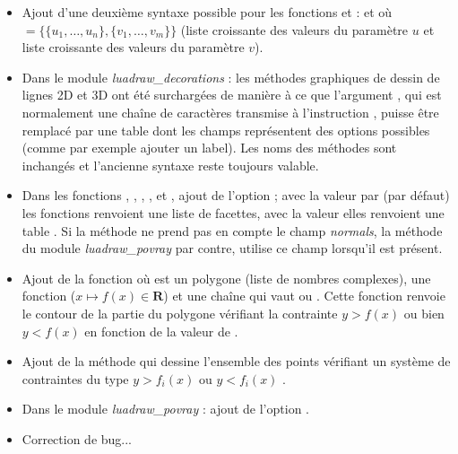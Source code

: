 \begin{itemize}
    \item Ajout d'une deuxième syntaxe possible pour les fonctions  et  :  et  où $=\{\{u_1,\ldots,u_n\}, \{v_1,\ldots,v_m\}\}$ (liste croissante des valeurs du paramètre $u$ et liste croissante des valeurs du paramètre $v$).

    \item Dans le module \emph{luadraw\_decorations} : les méthodes graphiques de dessin de lignes 2D et 3D ont été surchargées de manière à ce que l'argument , qui est normalement une chaîne de caractères transmise à l'instruction \drawcmd, puisse être remplacé par une table dont les champs représentent des options possibles (comme par exemple ajouter un label). Les noms des méthodes sont inchangés et l'ancienne syntaxe reste toujours valable.
    
    \item Dans les fonctions , , , ,  et , ajout de l'option ; avec la valeur par \false (par défaut) les fonctions renvoient une liste de facettes, avec la valeur \true elles renvoient une table . Si la méthode  ne prend pas en compte le champ \emph{normals}, la méthode  du module \emph{luadraw\_povray} par contre, utilise ce champ lorsqu'il est présent.
    
    \item Ajout de la fonction  où  est un polygone (liste de nombres complexes),  une fonction ($x\mapsto f(x)\in \mathbf R$) et  une chaîne qui vaut  ou . Cette fonction renvoie le contour de la partie du polygone vérifiant la contrainte $y>f(x)$ ou bien $y<f(x)$ en fonction de la valeur de .
    
    \item Ajout de la méthode  qui dessine l'ensemble des points vérifiant un système de contraintes du type $y>f_i(x)$ ou $y<f_i(x)$ .
    
    \item Dans le module \emph{luadraw\_povray} : ajout de l'option .
    
    \item Correction de bug...
\end{itemize}

